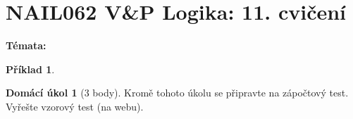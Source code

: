 \documentclass[a4paper]{article}
\theoremstyle{definition}
\newtheorem{problem}{Příklad}
\newtheorem*{ukol}{Domácí úkol}
\begin{document}
\section*{NAIL062 V\&P Logika: 11. cvičení}


\textbf{Témata:}



\medskip\begin{problem}
 
\end{problem}


\medskip\begin{ukol}[3 body]


Kromě tohoto úkolu se připravte na zápočtový test. Vyřešte vzorový test (na webu).
\end{ukol}
\end{document}
